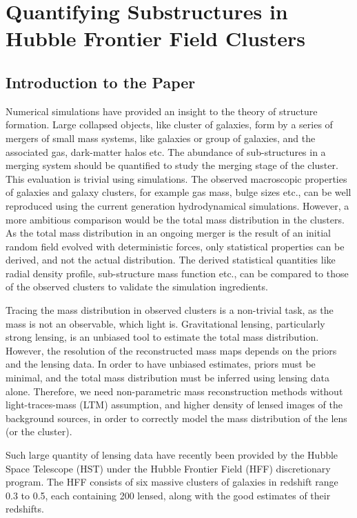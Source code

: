 \documentclass[
  11pt,
  twoside,
  openright,
  titlepage,
  headings=optiontoheadandtoc
]{scrbook}
\begin{document}
\chapter{Quantifying Substructures in Hubble Frontier Field Clusters}
\label{p5:chap:hff-substructures}

\section{Introduction to the Paper}

Numerical simulations have provided an insight to the theory of structure formation. 
Large collapsed objects, like cluster of galaxies, form by a series of mergers of 
small mass systems, like galaxies or group of galaxies, and the associated gas, dark-matter
halos etc. The abundance of sub-structures in a merging system should be quantified 
to study the merging stage of the cluster. This evaluation is trivial using simulations. 
The observed macroscopic properties of galaxies and galaxy clusters, for example 
gas mass, bulge sizes
etc., can be well reproduced using the current generation hydrodynamical simulations. 
However, a more ambitious comparison would be the total mass distribution in the
clusters. As the total mass distribution in an ongoing merger is the result
of an initial random field evolved with deterministic forces, only statistical
properties can be derived, and not the actual distribution. The derived statistical
quantities like radial density profile, sub-structure mass function etc., can be
compared to those of the observed clusters to validate the simulation
ingredients. 

Tracing the mass distribution in observed clusters is a non-trivial task, as 
the mass is not an observable, which light is. Gravitational lensing, particularly
strong lensing, is an unbiased 
tool to estimate the total mass distribution. However, the resolution of the
reconstructed mass maps depends on the priors and the lensing data. In order to
have unbiased estimates, priors must be minimal, and the total mass distribution
must be inferred using lensing data alone. Therefore, we need non-parametric
mass reconstruction methods without light-traces-mass (LTM) assumption, and higher
density of lensed images of the background sources, in order to correctly model 
the mass distribution of the lens (or the cluster).

Such large quantity of lensing data have recently been provided by the Hubble Space
Telescope (HST) under the Hubble Frontier Field (HFF) discretionary program. The HFF 
consists of six massive clusters of galaxies in redshift range 0.3 to 0.5, each 
containing 200 lensed, along 
with the good estimates of their redshifts. 
\end{document}
